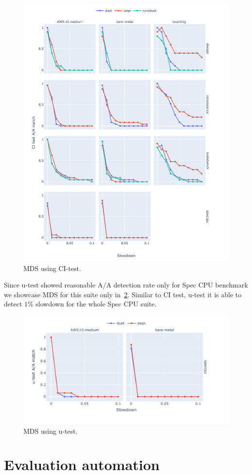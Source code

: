 \begin{figure}
	\centering
	\includegraphics[width=1\linewidth]{./figures/mds_citest.pdf}
	\caption{
    MDS using CI-test.
	}
	\label{fig:mds_citest}
\end{figure}

Since \mbox{u-test} showed reasonable A/A detection rate only for Spec CPU benchmark we showcase MDS for this suite only in~\cref{fig:mds_utest}.
Similar to CI test, \mbox{u-test} it is able to detect $1\%$ slowdown for the whole Spec CPU suite.

\begin{figure}
	\centering
	\includegraphics[width=1\linewidth]{./figures/mds_utest.pdf}
	\caption{
    MDS using \mbox{u-test}.
	}
	\label{fig:mds_utest}
\end{figure}

\section{Evaluation automation}
\label{sec:automation}

